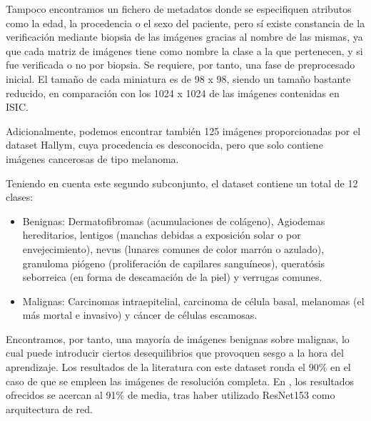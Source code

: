 Tampoco encontramos un fichero de metadatos donde se especifiquen atributos como la edad, la procedencia o el sexo del paciente, pero sí existe constancia de la verificación mediante biopsia de las imágenes gracias al nombre de las mismas, ya que cada matriz de imágenes tiene como nombre la clase a la que pertenecen, y si fue verificada o no por biopsia. Se requiere, por tanto, una fase de preprocesado inicial. El tamaño de cada miniatura es de 98 x 98, siendo un tamaño bastante reducido, en comparación con los 1024 x 1024 de las imágenes contenidas en ISIC.

Adicionalmente, podemos encontrar también 125 imágenes proporcionadas por el dataset Hallym, cuya procedencia es desconocida, pero que solo contiene imágenes cancerosas de tipo melanoma.

Teniendo en cuenta este segundo subconjunto, el dataset contiene un total de 12 clases:
\begin{itemize}
	\item Benignas: Dermatofibromas (acumulaciones de colágeno), Agiodemas hereditarios, lentigos (manchas debidas a exposición solar o por envejecimiento), nevus (lunares comunes de color marrón o azulado), granuloma piógeno (proliferación de capilares sanguíneos), queratósis seborreica (en forma de descamación de la piel) y verrugas comunes.
	 \item Malignas: Carcinomas intraepitelial, carcinoma de célula basal, melanomas (el más mortal e invasivo) y cáncer de células escamosas.
\end{itemize}

Encontramos, por tanto, una mayoría de imágenes benignas sobre malignas, lo cual puede introducir ciertos desequilibrios que provoquen sesgo a la hora del aprendizaje. Los resultados de la literatura con este dataset ronda el 90\% en el caso de que se empleen las imágenes de resolución completa. En \cite{HAN20189}, los resultados ofrecidos se acercan al 91\% de media, tras haber utilizado ResNet153 como arquitectura de red.


